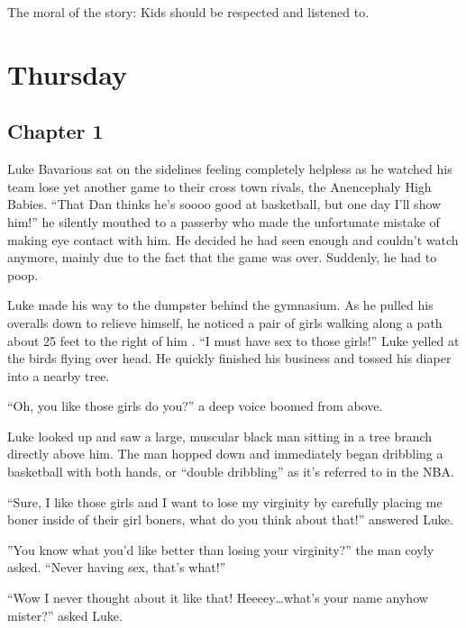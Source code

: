The moral of the story: Kids should be respected and listened
to.



\chapter{Thursday}

\section*{Chapter 1}

Luke Bavarious sat on the sidelines feeling completely helpless as
he watched his team lose yet another game to their cross town
rivals, the Anencephaly High Babies. ``That Dan thinks he's soooo
good at basketball, but one day I'll show him!'' he silently
mouthed to a passerby who made the unfortunate mistake of making
eye contact with him. He decided he had seen enough and couldn't
watch anymore, mainly due to the fact that the game was over.
Suddenly, he had to poop.



Luke made his way to the dumpster behind the gymnasium. As he
pulled his overalls down to relieve himself, he noticed a pair of
girls walking along a path about 25 feet to the right of him . ``I
must have sex to those girls!'' Luke yelled at the birds flying over
head. He quickly finished his business and tossed his diaper into a
nearby tree.



``Oh, you like those girls do you?'' a deep voice boomed from
above.



Luke looked up and saw a large, muscular black man sitting in a
tree branch directly above him. The man hopped down and immediately
began dribbling a basketball with both hands, or ``double dribbling''
as it's referred to in the NBA.



``Sure, I like those girls and I want to lose my virginity by
carefully placing me boner inside of their girl boners, what do you
think about that!'' answered Luke.



''You know what you'd like better than losing your virginity?''
the man coyly asked. ``Never having sex, that's what!''



``Wow I never thought about it like that! Heeeey{\ldots}what's your
name anyhow mister?'' asked Luke.



